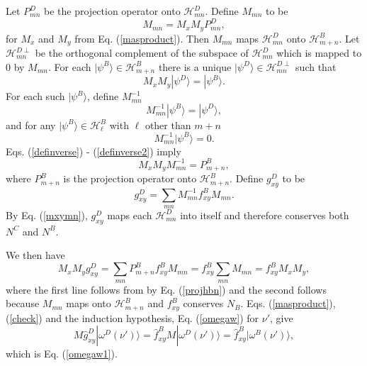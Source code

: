 \documentclass[12pt,amsmath,amssymb,onecolumn]{revtex4-2}
\begin{document}
Let $P^D_{mn}$ be the projection operator onto $\mathcal{H}^D_{mn}$.
Define $M_{mn}$ to be
\begin{equation}
  \label{mxymn}
  M_{mn} = M_x M_y P^D_{mn},
\end{equation}
for $M_x$ and $M_y$ from Eq. (\ref{masproduct}).
Then $M_{mn}$ maps $\mathcal{H}^D_{mn}$ onto $\mathcal{H}^B_{m+n}$.
Let $\mathcal{H}^{D\perp}_{mn}$  be the orthogonal complement
of the subspace of $\mathcal{H}^D_{mn}$ which is mapped
to 0 by $M_{mn}$. For each $|\psi^B \rangle  \in \mathcal{H}^B_{m+n}$
there is a unique $|\psi^D \rangle  \in \mathcal{H}^{D\perp}_{mn}$ such
that
\begin{equation}
  \label{definverse}
  M_x M_y |\psi^D \rangle  = |\psi^B \rangle .
\end{equation}
For each such $|\psi^B \rangle $, define $M_{mn}^{-1}$
\begin{equation}
  \label{definverse1}
  M_{mn}^{-1}|\psi^B \rangle  = |\psi^D \rangle ,
\end{equation}
and for any $|\psi^B \rangle  \in \mathcal{H}^B_\ell$ with
$\ell$ other than $m + n$
\begin{equation}
  \label{definverse2}
  M_{mn}^{-1}|\psi^B \rangle  = 0.
\end{equation}
Eqs. (\ref{definverse}) - (\ref{definverse2}) imply
\begin{equation}
  \label{projhbn}
  M_x M_y M_{mn}^{-1} = P^B_{m+n},
\end{equation}
where $P^B_{m+n}$ is the projection operator onto $\mathcal{H}^B_{m+n}$.
Define $g^D_{xy}$ to be
\begin{equation}
  \label{fdxy}
  g^D_{xy} = \sum_{mn} M_{mn}^{-1} f^B_{xy} M_{mn}.
\end{equation}
By Eq. (\ref{mxymn}), $g^D_{xy}$ maps each $\mathcal{H}^D_{mn}$
into itself and therefore conserves both $N^C$ and $N^B$.

  
We then have
\begin{equation}
  \label{check}
  M_x M_y g^D_{xy} = \sum_{mn} P^B_{m+n} f^B_{xy} M_{mn}
  = f^B_{xy} \sum_{mn}  M_{mn}
  = f^B_{xy} M_x M_y,
\end{equation}
where the first line follows from by Eq. (\ref{projhbn})
and the second follows because $M_{mn}$ maps onto
$\mathcal{H}^B_{m+n}$ and $f^B_{xy}$ conserves $N_B$.
Eqs. (\ref{masproduct}), (\ref{check}) and the induction hypothesis, Eq. (\ref{omegaw}) for
$\nu'$, give
\begin{equation}
  \label{check1}
  M \hat{g}^D_{xy} |\omega^D(\nu') \rangle  = \hat{f}^B_{xy} M|\omega^D(\nu') \rangle
  = \hat{f}^B_{xy} |\omega^B(\nu') \rangle ,
\end{equation}
which is Eq. (\ref{omegaw1}).
\end{document}
